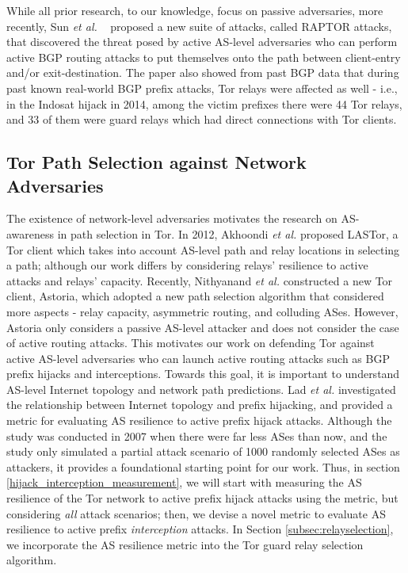 While all prior research, to our knowledge, focus on passive adversaries, more recently, Sun \emph{et al.} ~\cite{sun2015raptor} proposed a new suite of attacks, called RAPTOR attacks, that discovered the threat posed by active AS-level adversaries who can perform active BGP routing attacks to put themselves onto the path between client-entry and/or exit-destination. The paper also showed from past BGP data that during past known real-world BGP prefix attacks, Tor relays were affected as well - i.e., in the Indosat hijack in 2014, among the victim prefixes there were 44 Tor relays, and 33 of them were guard relays which had direct connections with Tor clients. 

\subsection{Tor Path Selection against Network Adversaries}
The existence of network-level adversaries motivates the research on AS-awareness in path selection in Tor. In 2012, Akhoondi \emph{et al.} \cite{akhoondi2012lastor} proposed LASTor, a Tor client which takes into account AS-level path and relay locations in selecting a path; although our work differs by considering relays' resilience to active attacks and relays' capacity. Recently, Nithyanand \emph{et al.} \cite{starov2015measuring} constructed a new Tor client, Astoria, which adopted a new path selection algorithm that considered more aspects - relay capacity, asymmetric routing, and colluding ASes. However, Astoria only considers a passive AS-level attacker and does not consider the case of active routing attacks.
This motivates our work on defending Tor against active AS-level adversaries who can launch active routing attacks such as BGP prefix hijacks and interceptions. Towards this goal, it is important to understand AS-level Internet topology and network path predictions. Lad \emph{et al.} \cite{lad2007understanding} investigated the relationship between Internet topology and prefix hijacking, and provided a metric for evaluating AS resilience to active prefix hijack attacks. Although the study was conducted in 2007 when there were far less ASes than now, and the study only simulated a partial attack scenario of 1000 randomly selected ASes as attackers, it provides a foundational starting point for our work. Thus, in section \ref{hijack_interception_measurement}, we will start with measuring the AS resilience of the Tor network to active prefix hijack attacks using the metric, but considering \emph{all} attack scenarios; then, we devise a novel metric to evaluate AS resilience to active prefix \emph{interception} attacks. In Section \ref{subsec:relayselection}, we incorporate the AS resilience metric into the Tor guard relay selection algorithm. 


